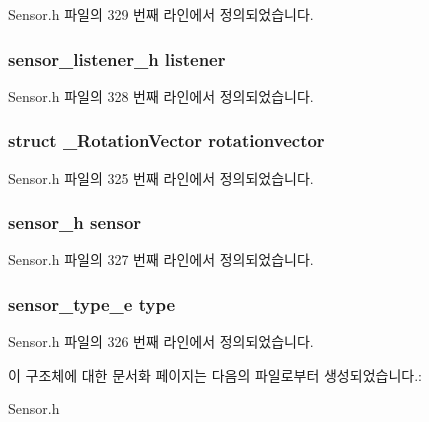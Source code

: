 Sensor.\-h 파일의 329 번째 라인에서 정의되었습니다.

\hypertarget{struct__RotationVectorExtend_aa977dfb866b24fd7d9a20a9a01b2fd1f}{
\subsubsection[{listener}]{\setlength{\rightskip}{0pt plus 5cm}sensor\-\_\-listener\-\_\-h listener}}\label{struct__RotationVectorExtend_aa977dfb866b24fd7d9a20a9a01b2fd1f}


Sensor.\-h 파일의 328 번째 라인에서 정의되었습니다.

\hypertarget{struct__RotationVectorExtend_a273e40af4ef4690cbb95f7f77b6ef54e}{
\subsubsection[{rotationvector}]{\setlength{\rightskip}{0pt plus 5cm}struct {\bf \-\_\-\-Rotation\-Vector} rotationvector}}\label{struct__RotationVectorExtend_a273e40af4ef4690cbb95f7f77b6ef54e}


Sensor.\-h 파일의 325 번째 라인에서 정의되었습니다.

\hypertarget{struct__RotationVectorExtend_a5bae9b7801bc3808411925cde81d3f26}{
\subsubsection[{sensor}]{\setlength{\rightskip}{0pt plus 5cm}sensor\-\_\-h sensor}}\label{struct__RotationVectorExtend_a5bae9b7801bc3808411925cde81d3f26}


Sensor.\-h 파일의 327 번째 라인에서 정의되었습니다.

\hypertarget{struct__RotationVectorExtend_abffb09766da2fc510a79bb51f82a36e1}{
\subsubsection[{type}]{\setlength{\rightskip}{0pt plus 5cm}sensor\-\_\-type\-\_\-e type}}\label{struct__RotationVectorExtend_abffb09766da2fc510a79bb51f82a36e1}


Sensor.\-h 파일의 326 번째 라인에서 정의되었습니다.



이 구조체에 대한 문서화 페이지는 다음의 파일로부터 생성되었습니다.\-:\begin{DoxyCompactItemize}
\item 
Sensor.\-h\end{DoxyCompactItemize}
